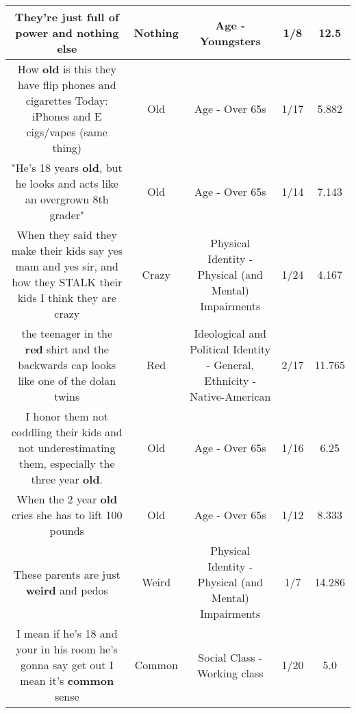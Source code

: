 \documentclass[11pt]{article}
\newlength\mylength
\begin{document}
\begin{center}
\begin{longtable}{|C{.65\mylength}|C{.30\mylength}|C{.12\mylength}|C{.12\mylength}|C{.12\mylength}|}
  \small They're just full of power and \textbf{nothing} else\normalsize   & Nothing & Age - Youngsters & 1/8 & 12.5 \\  \hline
  \small How \textbf{old} is this they have flip phones and cigarettes Today: iPhones and E cigs/vapes (same thing)\normalsize   & Old & Age - Over 65s & 1/17 & 5.882 \\  \hline
  \small "He's 18 years \textbf{old}, but he looks and acts like an overgrown 8th grader"\normalsize   & Old & Age - Over 65s & 1/14 & 7.143 \\  \hline
  \small When they said they make their kids say yes mam and yes sir, and how they STALK their kids I think they are crazy\normalsize   & Crazy & Physical Identity - Physical (and Mental) Impairments & 1/24 & 4.167 \\  \hline
  \small the teenager in the \textbf{r\textbf{ed}} shirt and the backwards cap looks like one of the dolan twins\normalsize   & Red &  Ideological and Political Identity - General, Ethnicity - Native-American & 2/17 & 11.765 \\  \hline
  \small I honor them not coddling their kids and not underestimating them, especially the three year \textbf{old}.\normalsize   & Old & Age - Over 65s & 1/16 & 6.25 \\  \hline
  \small When the 2 year \textbf{old} cries she has to lift 100 pounds\normalsize   & Old & Age - Over 65s & 1/12 & 8.333 \\  \hline
  \small These parents are just \textbf{weird} and pedos\normalsize   & Weird & Physical Identity - Physical (and Mental) Impairments & 1/7 & 14.286 \\  \hline
  \small I mean if he's 18 and your in his room he's gonna say get out I mean it's \textbf{common} sense\normalsize   & Common & Social Class - Working class & 1/20 & 5.0 \\  \hline

\end{longtable}
\end{center}
\end{document}

